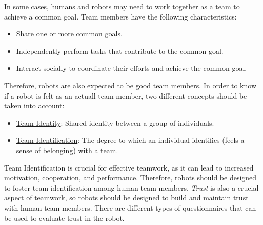 In some cases, humans and robots may need to work together as a team to achieve a common goal. Team members have the following characteristics:
\begin{itemize}
    \item Share one or more common goals.
    \item Independently perform tasks that contribute to the common goal.
    \item Interact socially to coordinate their efforts and achieve the common goal.
\end{itemize}

Therefore, robots are also expected to be good team members. In order to know if a robot is felt as an actuall team member, two different concepts should be taken into account:
\begin{itemize}
    \item \ul{Team Identity}: Shared identity between a group of individuals.
    \item \ul{Team Identification}: The degree to which an individual identifies (feels a sense of belonging) with a team.
\end{itemize}

Team Identification is crucial for effective teamwork, as it can lead to increased motivation, cooperation, and performance. Therefore, robots should be designed to foster team identification among human team members. \emph{Trust} is also a crucial aspect of teamwork, so robots should be designed to build and maintain trust with human team members. There are different types of questionnaires that can be used to evaluate trust in the robot.